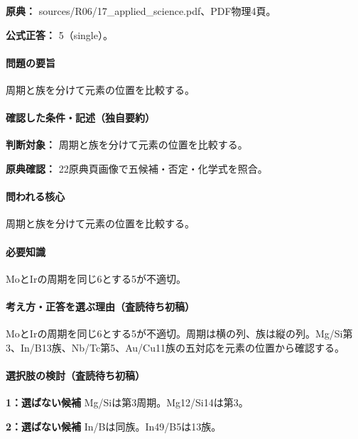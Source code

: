 \noindent\textbf{原典：} sources/R06/17\_applied\_science.pdf、PDF物理4頁。

\textbf{公式正答：} 5（single）。

\paragraph{問題の要旨} 周期と族を分けて元素の位置を比較する。

\paragraph{確認した条件・記述（独自要約）}\mbox{}\par

\noindent\textbf{判断対象：} 周期と族を分けて元素の位置を比較する。\par

\noindent\textbf{原典確認：} 22原典頁画像で五候補・否定・化学式を照合。\par

\paragraph{問われる核心} 周期と族を分けて元素の位置を比較する。

\paragraph{必要知識} MoとIrの周期を同じ6とする5が不適切。

\paragraph{考え方・正答を選ぶ理由（査読待ち初稿）} MoとIrの周期を同じ6とする5が不適切。周期は横の列、族は縦の列。Mg/Si第3、In/B13族、Nb/Tc第5、Au/Cu11族の五対応を元素の位置から確認する。

\paragraph{選択肢の検討（査読待ち初稿）}\mbox{}\par

\noindent\textbf{1：選ばない候補} Mg/Siは第3周期。Mg12/Si14は第3。\par

\noindent\textbf{2：選ばない候補} In/Bは同族。In49/B5は13族。\par

